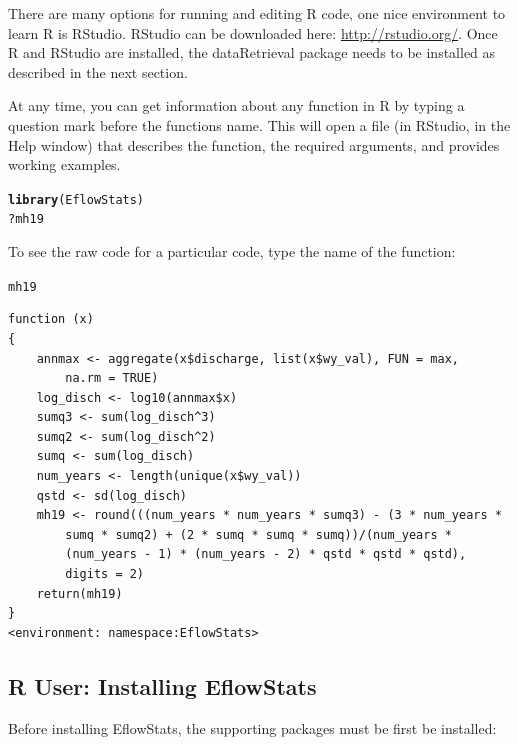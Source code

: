 \documentclass[a4paper,11pt]{article}\usepackage[]{graphicx}\usepackage[]{color}
\makeatletter
\newcommand{\hlopt}[1]{\textcolor[rgb]{0,0,0}{#1}}%
\newcommand{\hlstd}[1]{\textcolor[rgb]{0.345,0.345,0.345}{#1}}%
\newcommand{\hlkwd}[1]{\textcolor[rgb]{0.737,0.353,0.396}{\textbf{#1}}}%
\newenvironment{kframe}{%
 \def\at@end@of@kframe{}%
 \ifinner\ifhmode%
  \def\at@end@of@kframe{\end{minipage}}%
  \begin{minipage}{\columnwidth}%
 \fi\fi%
 \def\FrameCommand##1{\hskip\@totalleftmargin \hskip-\fboxsep
 \colorbox{shadecolor}{##1}\hskip-\fboxsep
     \hskip-\linewidth \hskip-\@totalleftmargin \hskip\columnwidth}%
 \MakeFramed {\advance\hsize-\width
   \@totalleftmargin\z@ \linewidth\hsize
   \@setminipage}}%
 {\par\unskip\endMakeFramed%
 \at@end@of@kframe}
\newenvironment{knitrout}{}{} %
\makeatother
\begin{document}
There are many options for running and editing R code, one nice environment to learn R is RStudio. RStudio can be downloaded here: \url{http://rstudio.org/}. Once R and RStudio are installed, the dataRetrieval package needs to be installed as described in the next section.

At any time, you can get information about any function in R by typing a question mark before the functions name.  This will open a file (in RStudio, in the Help window) that describes the function, the required arguments, and provides working examples.

\begin{knitrout}
\color{fgcolor}\begin{kframe}
\begin{alltt}
\hlkwd{library}\hlstd{(EflowStats)}
\hlopt{?}\hlstd{mh19}
\end{alltt}
\end{kframe}
\end{knitrout}

To see the raw code for a particular code, type the name of the function:
\begin{knitrout}
\color{fgcolor}\begin{kframe}
\begin{alltt}
\hlstd{mh19}
\end{alltt}
\begin{verbatim}
function (x) 
{
    annmax <- aggregate(x$discharge, list(x$wy_val), FUN = max, 
        na.rm = TRUE)
    log_disch <- log10(annmax$x)
    sumq3 <- sum(log_disch^3)
    sumq2 <- sum(log_disch^2)
    sumq <- sum(log_disch)
    num_years <- length(unique(x$wy_val))
    qstd <- sd(log_disch)
    mh19 <- round(((num_years * num_years * sumq3) - (3 * num_years * 
        sumq * sumq2) + (2 * sumq * sumq * sumq))/(num_years * 
        (num_years - 1) * (num_years - 2) * qstd * qstd * qstd), 
        digits = 2)
    return(mh19)
}
<environment: namespace:EflowStats>
\end{verbatim}
\end{kframe}
\end{knitrout}

\FloatBarrier
\clearpage
\subsection{R User: Installing EflowStats}
Before installing EflowStats, the supporting packages must be first be installed:
\end{document}
